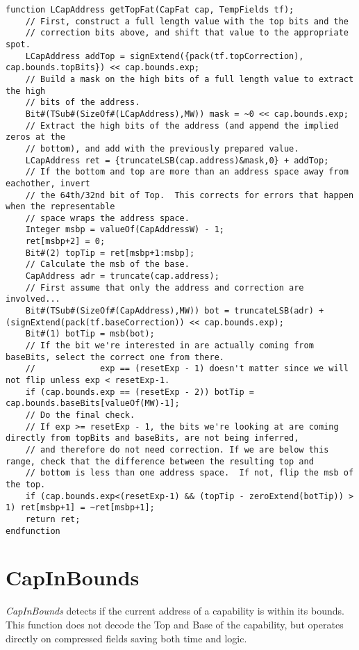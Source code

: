 \begin{lstlisting}[language=bluespec]
function LCapAddress getTopFat(CapFat cap, TempFields tf);
    // First, construct a full length value with the top bits and the
    // correction bits above, and shift that value to the appropriate spot.
    LCapAddress addTop = signExtend({pack(tf.topCorrection), cap.bounds.topBits}) << cap.bounds.exp;
    // Build a mask on the high bits of a full length value to extract the high
    // bits of the address.
    Bit#(TSub#(SizeOf#(LCapAddress),MW)) mask = ~0 << cap.bounds.exp;
    // Extract the high bits of the address (and append the implied zeros at the
    // bottom), and add with the previously prepared value.
    LCapAddress ret = {truncateLSB(cap.address)&mask,0} + addTop;
    // If the bottom and top are more than an address space away from eachother, invert
    // the 64th/32nd bit of Top.  This corrects for errors that happen when the representable
    // space wraps the address space.
    Integer msbp = valueOf(CapAddressW) - 1;
    ret[msbp+2] = 0;
    Bit#(2) topTip = ret[msbp+1:msbp];
    // Calculate the msb of the base.
    CapAddress adr = truncate(cap.address);
    // First assume that only the address and correction are involved...
    Bit#(TSub#(SizeOf#(CapAddress),MW)) bot = truncateLSB(adr) + (signExtend(pack(tf.baseCorrection)) << cap.bounds.exp);
    Bit#(1) botTip = msb(bot);
    // If the bit we're interested in are actually coming from baseBits, select the correct one from there.
    //             exp == (resetExp - 1) doesn't matter since we will not flip unless exp < resetExp-1.
    if (cap.bounds.exp == (resetExp - 2)) botTip = cap.bounds.baseBits[valueOf(MW)-1];
    // Do the final check.
    // If exp >= resetExp - 1, the bits we're looking at are coming directly from topBits and baseBits, are not being inferred,
    // and therefore do not need correction. If we are below this range, check that the difference between the resulting top and
    // bottom is less than one address space.  If not, flip the msb of the top.
    if (cap.bounds.exp<(resetExp-1) && (topTip - zeroExtend(botTip)) > 1) ret[msbp+1] = ~ret[msbp+1];
    return ret;
endfunction
\end{lstlisting}

\section{CapInBounds}
\label{sec:cheri-128-listings-capinbounds}

\emph{CapInBounds} detects if the current address of a capability is within its bounds.
This function does not decode the Top and Base of the capability,
but operates directly on compressed fields saving both time and logic.


